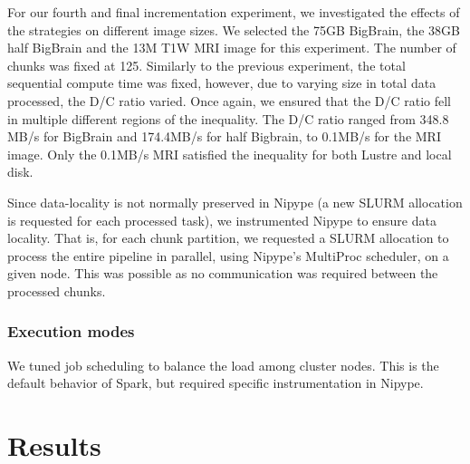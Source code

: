 \documentclass{IEEEtran}
\begin{document}
For our fourth and final incrementation experiment, we investigated the effects 
of the strategies on different image sizes. We selected the 75GB BigBrain, the
38GB half BigBrain and the 13M T1W MRI image for this experiment. The number of
chunks was fixed at 125. Similarly to the previous experiment, the total 
sequential compute time was fixed, however, due to varying size in total data 
processed, the D/C ratio varied. Once again, we ensured that the D/C ratio fell
in multiple different regions of the inequality. The D/C ratio ranged from 
348.8 MB/s for BigBrain and 174.4MB/s for half Bigbrain, to 0.1MB/s for the MRI 
image. Only the 0.1MB/s MRI satisfied the inequality for both Lustre and local 
disk.

Since data-locality is not normally preserved in Nipype (a new SLURM allocation 
is requested for each processed task), we instrumented Nipype to ensure data 
locality. That is, for each chunk partition, we requested a SLURM allocation to
process the entire pipeline in parallel, using Nipype's MultiProc scheduler, on 
a given node. This was possible as no communication was required between the 
processed chunks.










\subsubsection{Execution modes} %

We tuned job scheduling to balance the load among
cluster nodes. This is the default behavior of Spark, but required
specific instrumentation in Nipype.


\section{Results} %
\label{sec:results}

\end{document}
